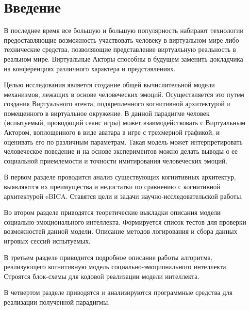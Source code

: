 \chapter*{Введение}
\label{sec:afterwords}


В последнее время все большую и большую популярность набирают технологии предоставляющие возможность участвовать человеку 
в виртуальном мире либо технические средства, позволяющие представление виртуальную реальность в реальном мире. 
Виртуальные Акторы способны в будущем заменить докладчика на конференциях различного характера и представлениях.

Целью исследования является создание общей вычислительной модели механизмов, лежащих в основе человеческих эмоций. Осуществляется это путем создания Виртуального агента, подкрепленного когнитивной архитектурой и помещенного в виртуальное окружение. В данной парадигме человек (испытуемый, проводящий сеанс игры) может взаимодействовать с Виртуальным Актором, воплощенного в виде аватара в игре с трехмерной графикой, и оценивать его по различным параметрам. Такая модель может интерпретировать человеческое поведение и на основе экспериментов можно делать выводы о ее социальной приемлемости и точности имитирования человеческих эмоций.

В первом разделе проводится анализ существующих когнитивных архитектур, выявляются их преимущества и недостатки по 
сравнению с когнитивной архитектурой eBICA. Ставятся цели и задачи научно-исследовательской работы. 

Во втором разделе приводятся теоретические выкладки описания модели социально-эмоционального интеллекта. 
Формируется список тестов для проверки возможностей данной модели. Описание методов логирования и сбора данных игровых сессий испытуемых.

В третьем разделе приводится подробное описание работы алгоритма, реализующего когнитивную модель социально-эмоционального интеллекта.
Строятся блок-схемы для кодовой реализации модели интеллекта.

В четвертом разделе приводятся и анализируются программные средства для реализации полученной парадигмы.